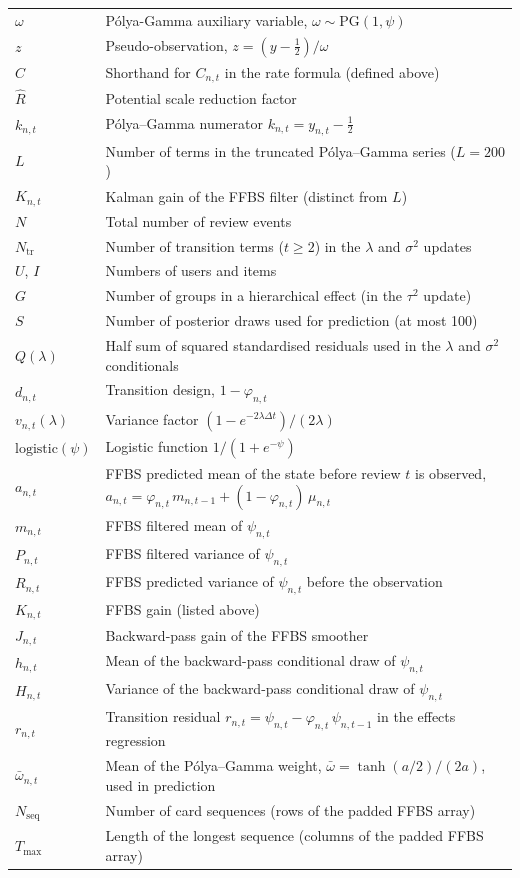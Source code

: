 \begin{longtable}{@{}p{3.2cm}p{10.3cm}@{}}
$\omega$ & P\'olya-Gamma auxiliary variable, $\omega \sim \mathrm{PG}(1,\psi)$\\
$z$ & Pseudo-observation, $z = (y - \tfrac{1}{2})/\omega$\\
$C$ & Shorthand for $C_{n,t}$ in the rate formula (defined above)\\
$\hat{R}$ & Potential scale reduction factor\\
$k_{n,t}$ & P\'olya--Gamma numerator $k_{n,t} = y_{n,t} - \tfrac{1}{2}$\\
$L$ & Number of terms in the truncated P\'olya--Gamma series ($L = 200$)\\
$K_{n,t}$ & Kalman gain of the FFBS filter (distinct from $L$)\\
$N$ & Total number of review events\\
$N_{\mathrm{tr}}$ & Number of transition terms ($t \ge 2$) in the $\lambda$ and $\sigma^2$ updates\\
$U$, $I$ & Numbers of users and items\\
$G$ & Number of groups in a hierarchical effect (in the $\tau^2$ update)\\
$S$ & Number of posterior draws used for prediction (at most 100)\\
$Q(\lambda)$ & Half sum of squared standardised residuals used in the $\lambda$ and $\sigma^2$ conditionals\\
$d_{n,t}$ & Transition design, $1-\varphi_{n,t}$\\
$v_{n,t}(\lambda)$ & Variance factor $(1-e^{-2\lambda\Delta t})/(2\lambda)$\\
$\mathrm{logistic}(\psi)$ & Logistic function $1/(1+e^{-\psi})$\\
$a_{n,t}$ & FFBS predicted mean of the state before review $t$ is observed, $a_{n,t} = \varphi_{n,t}\,m_{n,t-1} + (1-\varphi_{n,t})\,\mu_{n,t}$\\
$m_{n,t}$ & FFBS filtered mean of $\psi_{n,t}$\\
$P_{n,t}$ & FFBS filtered variance of $\psi_{n,t}$\\
$R_{n,t}$ & FFBS predicted variance of $\psi_{n,t}$ before the observation\\
$K_{n,t}$ & FFBS gain (listed above)\\
$J_{n,t}$ & Backward-pass gain of the FFBS smoother\\
$h_{n,t}$ & Mean of the backward-pass conditional draw of $\psi_{n,t}$\\
$H_{n,t}$ & Variance of the backward-pass conditional draw of $\psi_{n,t}$\\
$r_{n,t}$ & Transition residual $r_{n,t} = \psi_{n,t} - \varphi_{n,t}\,\psi_{n,t-1}$ in the effects regression\\
$\bar\omega_{n,t}$ & Mean of the P\'olya--Gamma weight, $\bar\omega = \tanh(a/2)/(2a)$, used in prediction\\
$N_{\mathrm{seq}}$ & Number of card sequences (rows of the padded FFBS array)\\
$T_{\max}$ & Length of the longest sequence (columns of the padded FFBS array)\\
\end{longtable}
